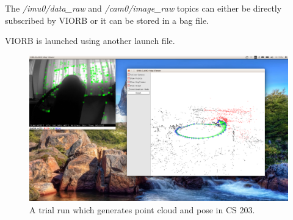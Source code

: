 The \textit{/imu0/data\_raw} and \textit{/cam0/image\_raw} topics can either be directly subscribed by VIORB or it can be stored in a bag file. 

VIORB is launched using another launch file.
\begin{figure}
	\centering
	\includegraphics[width=5in]{figures/cloudpoint}
	\caption[Trial run]{\small 
		 A trial run which generates point cloud and pose in CS 203. }
\end{figure}

\FloatBarrier
